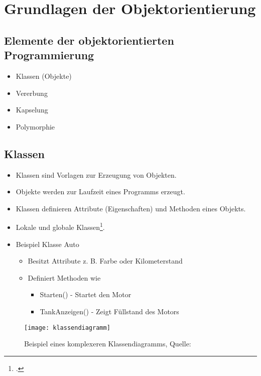 \section{Grundlagen der Objektorientierung}

\subsection{Elemente der objektorientierten Programmierung}
\begin{itemize}
    \item Klassen (Objekte)
    \item Vererbung
    \item Kapselung
    \item Polymorphie
\end{itemize}

\subsection{Klassen}
\begin{itemize}
    \item Klassen sind Vorlagen zur Erzeugung von Objekten.
    \item Objekte werden zur Laufzeit eines Programms erzeugt.
    \item Klassen definieren Attribute (Eigenschaften) und Methoden eines Objekts.
    \item Lokale und globale Klassen\footcite[Vgl.][S. 4]{zaidiSAPABAPObjects2019}. 
    \item Beispiel Klasse Auto
    \begin{itemize}
        \item Besitzt Attribute z. B. Farbe oder Kilometerstand
        \item Definiert Methoden wie
        \begin{itemize}
            \item Starten() - Startet den Motor
            \item TankAnzeigen() - Zeigt Füllstand des Motors
        \end{itemize}
    \end{itemize}
\end{itemize}

\begin{figure}
    \texttt{[image: klassendiagramm]}
    \caption{Beispiel eines komplexeren Klassendiagramms, Quelle: \textcite{wikipediabenutzerUMLKlassendiagramm}}
    \label{fig:bsp_klassendiagramm}
\end{figure}

